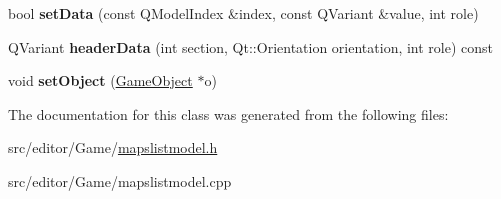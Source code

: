 \begin{DoxyCompactItemize}
\item 
\hypertarget{class_object_param_table_model_a12d16a09a52c80b39d039109e108f277}{bool {\bfseries set\-Data} (const \-Q\-Model\-Index \&index, const \-Q\-Variant \&value, int role)}\label{class_object_param_table_model_a12d16a09a52c80b39d039109e108f277}

\item 
\hypertarget{class_object_param_table_model_af115ad0740731c101adfe33ac4ee9d4f}{\-Q\-Variant {\bfseries header\-Data} (int section, \-Qt\-::\-Orientation orientation, int role) const }\label{class_object_param_table_model_af115ad0740731c101adfe33ac4ee9d4f}

\item 
\hypertarget{class_object_param_table_model_a106cbf5ef659e8d55dbf94d5297b6b4d}{void {\bfseries set\-Object} (\hyperlink{class_game_object}{\-Game\-Object} $\ast$o)}\label{class_object_param_table_model_a106cbf5ef659e8d55dbf94d5297b6b4d}

\end{DoxyCompactItemize}


\-The documentation for this class was generated from the following files\-:\begin{DoxyCompactItemize}
\item 
src/editor/\-Game/\hyperlink{mapslistmodel_8h}{mapslistmodel.\-h}\item 
src/editor/\-Game/mapslistmodel.\-cpp\end{DoxyCompactItemize}
